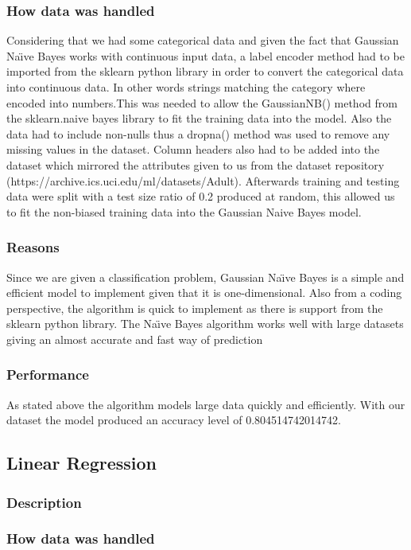 \documentclass[12pt]{article}
\begin{document}
	\subsubsection{How data was handled}
	Considering that we had some categorical data and given the fact that Gaussian Na\"{\i}ve Bayes works with continuous input data, a label encoder method had to be imported from the sklearn python library in order to convert the categorical data into continuous data. In other words strings matching the category where encoded into numbers.This was needed to allow the GaussianNB() method from the sklearn.naive bayes library to fit the training data into the model. Also the data had to include non-nulls thus a dropna() method was used to remove any missing values in the dataset. Column headers also had to be added into the dataset which mirrored the attributes given to us from the dataset repository (https://archive.ics.uci.edu/ml/datasets/Adult). Afterwards training and testing data were split with a test size ratio of 0.2 produced at random, this allowed us to fit the non-biased training data into the Gaussian Naive Bayes model.
	\subsubsection{Reasons} 
	Since we are given a classification problem, Gaussian Na\"{\i}ve Bayes is a simple and efficient model to implement given that it is one-dimensional. Also from a coding perspective, the algorithm is quick to implement as there is support from the sklearn python library. The Na\"{\i}ve Bayes algorithm works well with large datasets giving an almost accurate and fast way of prediction
	\subsubsection{Performance}
	As stated above the algorithm models large data quickly and efficiently. With our dataset the model produced an accuracy level of 0.804514742014742.  
	\newpage
	\subsection{Linear Regression}
	\subsubsection{Description}
	\subsubsection{How data was handled}
\end{document}
